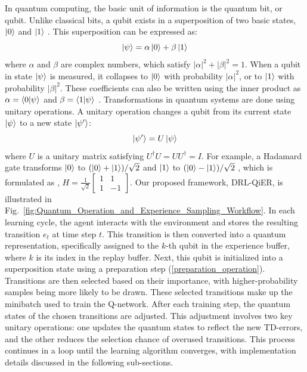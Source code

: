 \documentclass[journal]{IEEEtran}
\begin{document}
In quantum computing, the basic unit of information is the quantum bit, or qubit. Unlike classical bits, a qubit exists in a superposition of two basic states, $\ket{0}$ and $\ket{1}$ \cite{nielsen2010quantum}. This superposition can be expressed as:
\begin{equation}
\ket{\psi} = \alpha \ket{0} + \beta \ket{1}
\end{equation}
where $\alpha$ and $\beta$ are complex numbers, which satisfy $|\alpha|^2 + |\beta|^2 = 1$. When a qubit in state $\ket{\psi}$ is measured, it collapses to $\ket{0}$ with probability $|\alpha|^2$, or to $\ket{1}$ with probability $|\beta|^2$. These coefficients can also be written using the inner product as $\alpha = \braket{0|\psi}$ and $\beta = \braket{1|\psi}$ \cite{nielsen2010quantum}. Transformations in quantum systems are done using unitary operations. A unitary operation changes a qubit from its current state $\ket{\psi}$ to a new state $\ket{\psi'}$:
\begin{equation}
\ket{\psi'} = U\ket{\psi}
\end{equation}
where $U$ is a unitary matrix satisfying $U^\dagger U = UU^\dagger = I$.  For example, a Hadamard gate transforms $\ket{0}$ to $(\ket{0} + \ket{1})/\sqrt{2}$ and $\ket{1}$ to $(\ket{0} - \ket{1})/\sqrt{2}$ , which is formulated as \cite{nielsen2010quantum}, 
\( H=\frac {1}{\sqrt {2}}\left [{\begin{array}{cc}{1} & {1} \\ {1} & {-1}\end{array}}\right].
\)
Our proposed framework, DRL-QiER, is illustrated in Fig.~\ref{fig:Quantum_Operation_and_Experience_Sampling_Workflow}. In each learning cycle, the agent interacts with the environment and stores the resulting transition $e_t$ at time step $t$. This transition is then converted into a quantum representation, specifically assigned to the $k$-th qubit in the experience buffer, where $k$ is its index in the replay buffer. 
Next, this qubit is initialized into a superposition state using a preparation step (\ref{preparation_operation}). Transitions are then selected based on their importance, with higher-probability samples being more likely to be drawn. These selected transitions make up the minibatch used to train the  Q-network. After each training step, the quantum states of the chosen transitions are adjusted. This adjustment involves two key unitary operations: one updates the quantum states to reflect the new TD-errors, and the other reduces the selection chance of overused transitions. This process continues in a loop until the learning algorithm converges, with implementation details discussed in the following sub-sections.
\end{document}
